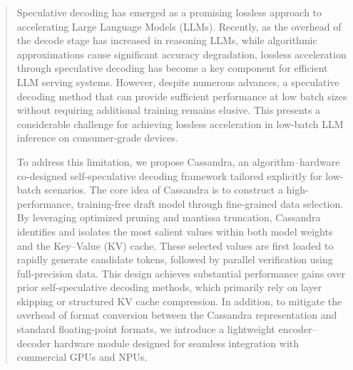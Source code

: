 \begin{abstract}

Speculative decoding has emerged as a promising lossless approach to accelerating Large Language Models (LLMs). Recently, as the overhead of the decode stage has increased in reasoning LLMs, while algorithmic approximations cause significant accuracy degradation, lossless acceleration through speculative decoding has become a key component for efficient LLM serving systems. However, despite numerous advances, a speculative decoding method that can provide sufficient performance at low batch sizes without requiring additional training remains elusive. This presents a considerable challenge for achieving lossless acceleration in low-batch LLM inference on consumer-grade devices.

To address this limitation, we propose Cassandra, an algorithm–hardware co-designed self-speculative decoding framework tailored explicitly for low-batch scenarios. The core idea of Cassandra is to construct a high-performance, training-free draft model through fine-grained data selection. By leveraging optimized pruning and mantissa truncation, Cassandra identifies and isolates the most salient values within both model weights and the Key–Value (KV) cache. These selected values are first loaded to rapidly generate candidate tokens, followed by parallel verification using full-precision data. This design achieves substantial performance gains over prior self-speculative decoding methods, which primarily rely on layer skipping or structured KV cache compression. In addition, to mitigate the overhead of format conversion between the Cassandra representation and standard floating-point formats, we introduce a lightweight encoder–decoder hardware module designed for seamless integration with commercial GPUs and NPUs.


\end{abstract}
